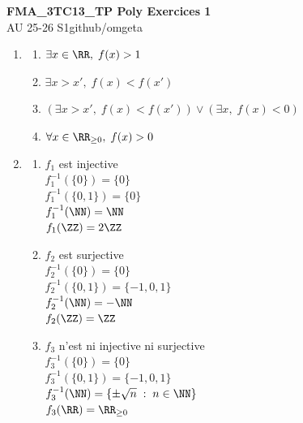 \documentclass[12pt, a4paper]{article}
\newcommand{\mytitle}{FMA\_3TC13\_TP Poly Exercices 1}
\newcommand{\myauthor}{github/omgeta}
\newcommand{\mydate}{AU 25-26 S1}
\begin{document}
\raggedright
\footnotesize
\begin{center}
{\normalsize{\textbf{\mytitle}}} \\
{\footnotesize{\mydate\hspace{2pt}\textemdash\hspace{2pt}\myauthor}}
\end{center}
\begin{enumerate}[label=1.\arabic*., start=15]
  \item  
    \begin{enumerate}[\arabic*.]
      \item $\exists x \in \RR,\; f(x) > 1$ 
      \item $\exists x > x', \; f(x) < f(x')$
      \item $(\exists x > x',\; f(x) < f(x')) \lor (\exists x,\; f(x) < 0)$
      \item $\forall x \in \RR_{\geq 0}, \; f(x) > 0$
    \end{enumerate}

  \item  
    \begin{enumerate}[\arabic*.]
      \item $f_1$ est injective\\ 
        $f_1^{-1}(\{0\}) = \{0\}$\\ 
        $f_1^{-1}(\{0, 1\}) = \{0\}$\\ 
        $f_1^{-1}(\NN) = \NN$\\ 
        $f_1(\ZZ) = 2\ZZ$ 

      \item $f_2$ est surjective\\ 
        $f_2^{-1}(\{0\}) = \{0\}$\\ 
        $f_2^{-1}(\{0, 1\}) = \{-1, 0, 1\}$\\ 
        $f_2^{-1}(\NN) = -\NN$\\ 
        $f_2(\ZZ) = \ZZ$ 

      \item $f_3$ n'est ni injective ni surjective\\ 
        $f_3^{-1}(\{0\}) = \{0\}$\\ 
        $f_3^{-1}(\{0, 1\}) = \{-1, 0, 1\}$\\ 
        $f_3^{-1}(\NN) = \{\pm \sqrt n\;:\; n \in \NN\}$\\ 
        $f_3(\RR) = \RR_{\geq 0}$ 


\end{enumerate}
\end{enumerate}
\end{document}
